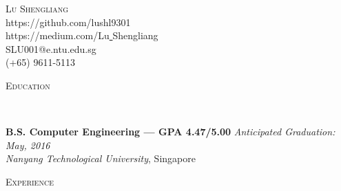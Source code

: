 \documentclass[9pt]{article}
\newenvironment{changemargin}[2]{%
  \begin{list}{}{%
      \setlength{\topsep}{0pt}%
      \setlength{\leftmargin}{#1}%
      \setlength{\rightmargin}{#2}%
      \setlength{\listparindent}{\parindent}%
      \setlength{\itemindent}{\parindent}%
      \setlength{\parsep}{\parskip}%
    }%
  \item[]}{\end{list}
}
\newcommand{\lineover}{
  \begin{changemargin}{-0.05in}{-0.05in}
    \vspace*{-8pt}
    \hrulefill \\
    \vspace*{-2pt}
  \end{changemargin}
}
\newcommand{\header}[1]{
  \begin{changemargin}{-0.5in}{-0.5in}
    \scshape{#1}\\
    \lineover
  \end{changemargin}
}
\newcommand{\contact}[5]{
  \begin{changemargin}{-0.5in}{-0.5in}
    \begin{center}
      {\Large \scshape {#1}}\\ \smallskip
      {#2}\\ \smallskip 
      {#3}\\ \smallskip
      {#4}\\ \smallskip
      {#5}\smallskip
    \end{center}
  \end{changemargin}
}
\newenvironment{body}
{
\vspace*{-16pt}
\begin{changemargin}{-0.25in}{-0.5in}
}	
{
\end{changemargin}
}
\begin{document}
\contact{Lu Shengliang}{https://github.com/lushl9301}{https://medium.com/Lu\underline{ }Shengliang}{SLU001@e.ntu.edu.sg}{(+65) 9611-5113}


%
%
%
%
\header{Education}

\begin{body}
  \vspace{14pt}
  \textbf{B.S. Computer Engineering --- GPA 4.47/5.00} \hfill \emph{Anticipated Graduation: May, 2016} \\
  \emph{Nanyang Technological University}, Singapore\\
\end{body}

\smallskip


\header{Experience}
\end{document}
